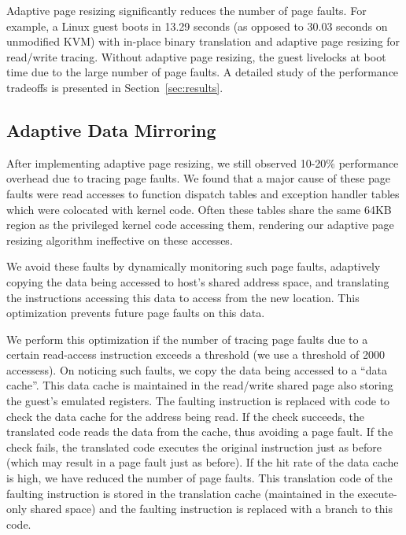 \documentclass[10pt,twocolumn]{article}
\begin{document}
Adaptive page resizing significantly reduces the number of page faults. For
example, a Linux guest boots in 13.29 seconds (as opposed to 30.03 seconds on
unmodified KVM) with in-place binary translation
and adaptive page resizing for read/write tracing. Without adaptive page resizing,
the guest livelocks at boot time due to the large number of
page faults. A detailed study of the performance tradeoffs is presented in
Section~\ref{sec:results}.

\subsection{Adaptive Data Mirroring}
After implementing adaptive page resizing,
we still observed 10-20\% performance overhead due
to tracing page faults. We found that a major cause of these page faults were
read accesses to function dispatch tables and exception handler tables which were
colocated with kernel code. Often these tables share
the same 64KB region as the privileged kernel code accessing them, rendering our
adaptive page resizing algorithm ineffective on these accesses.

We avoid these faults by dynamically monitoring such page faults, adaptively
copying the data being accessed to host's shared address space, and
translating the instructions accessing this data to access from the new location.
This optimization prevents future page faults on this data.

We perform this optimization if the number of tracing page faults
due to a certain read-access instruction exceeds a threshold (we use a threshold
of 2000 accessess). On noticing
such faults, we copy the data being accessed
to a ``data cache''. This data cache is maintained in the read/write shared page
also storing the guest's emulated registers.
The faulting instruction is replaced with
code to check the data cache for the address being read. If the check succeeds, the
translated code reads the data from the cache, thus avoiding a page fault.
If the check fails, the translated code executes the original
instruction just as before (which may result in a page fault just as before).
If the hit rate of the data cache is high, we have reduced the number of page faults.
This translation code of the faulting instruction is stored in the translation
cache (maintained in the execute-only shared space) and the faulting
instruction is replaced with a branch to this code.
\end{document}
